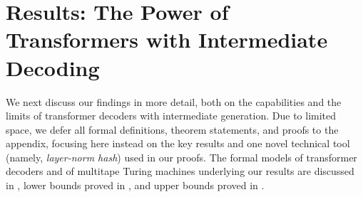 \documentclass{article}
\begin{document}
\section{Results: The Power of Transformers with Intermediate Decoding}


We next discuss our findings in more detail, both on the capabilities and the limits of transformer decoders with intermediate generation. Due to limited space, we defer all formal definitions, theorem statements, and proofs to the appendix, focusing here instead on the key results and one novel technical tool (namely, \emph{layer-norm hash}) used in our proofs. The formal models of transformer decoders and of multitape Turing machines underlying our results are discussed in , lower bounds proved in , and upper bounds proved in .
\end{document}

